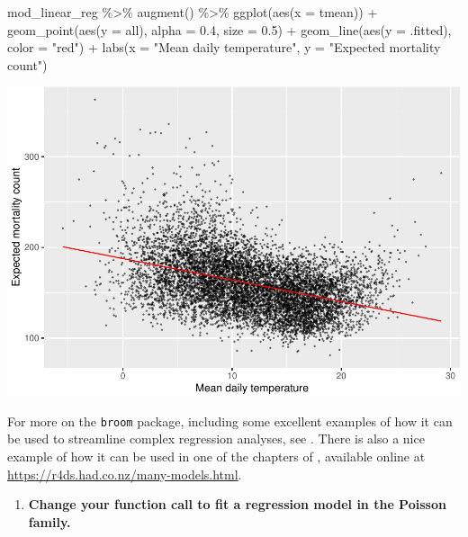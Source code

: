 \documentclass[
]{book}
\newenvironment{Shaded}{\begin{snugshade}}{\end{snugshade}}
\newcommand{\AttributeTok}[1]{\textcolor[rgb]{0.77,0.63,0.00}{#1}}
\newcommand{\FloatTok}[1]{\textcolor[rgb]{0.00,0.00,0.81}{#1}}
\newcommand{\FunctionTok}[1]{\textcolor[rgb]{0.00,0.00,0.00}{#1}}
\newcommand{\NormalTok}[1]{#1}
\newcommand{\SpecialCharTok}[1]{\textcolor[rgb]{0.00,0.00,0.00}{#1}}
\newcommand{\StringTok}[1]{\textcolor[rgb]{0.31,0.60,0.02}{#1}}
\providecommand{\tightlist}{%
  \setlength{\itemsep}{0pt}\setlength{\parskip}{0pt}}
\begin{document}
\begin{Shaded}
\begin{Highlighting}[]
\NormalTok{mod\_linear\_reg }\SpecialCharTok{\%\textgreater{}\%} 
  \FunctionTok{augment}\NormalTok{() }\SpecialCharTok{\%\textgreater{}\%} 
  \FunctionTok{ggplot}\NormalTok{(}\FunctionTok{aes}\NormalTok{(}\AttributeTok{x =}\NormalTok{ tmean)) }\SpecialCharTok{+} 
  \FunctionTok{geom\_point}\NormalTok{(}\FunctionTok{aes}\NormalTok{(}\AttributeTok{y =}\NormalTok{ all), }\AttributeTok{alpha =} \FloatTok{0.4}\NormalTok{, }\AttributeTok{size =} \FloatTok{0.5}\NormalTok{) }\SpecialCharTok{+} 
  \FunctionTok{geom\_line}\NormalTok{(}\FunctionTok{aes}\NormalTok{(}\AttributeTok{y =}\NormalTok{ .fitted), }\AttributeTok{color =} \StringTok{"red"}\NormalTok{) }\SpecialCharTok{+} 
  \FunctionTok{labs}\NormalTok{(}\AttributeTok{x =} \StringTok{"Mean daily temperature"}\NormalTok{, }\AttributeTok{y =} \StringTok{"Expected mortality count"}\NormalTok{)}
\end{Highlighting}
\end{Shaded}

\includegraphics{adv_epi_analysis_files/figure-latex/unnamed-chunk-29-1.pdf}

For more on the \texttt{broom} package, including some excellent examples of how it
can be used to streamline complex regression analyses, see \citet{robinson2014broom}.
There is also a nice example of how it can be used in one of the chapters of
\citet{wickham2016r}, available online at \url{https://r4ds.had.co.nz/many-models.html}.

\begin{enumerate}
\def\labelenumi{\arabic{enumi}.}
\setcounter{enumi}{1}
\tightlist
\item
  \textbf{Change your function call to fit a regression model in the Poisson family.}
\end{enumerate}
\end{document}
